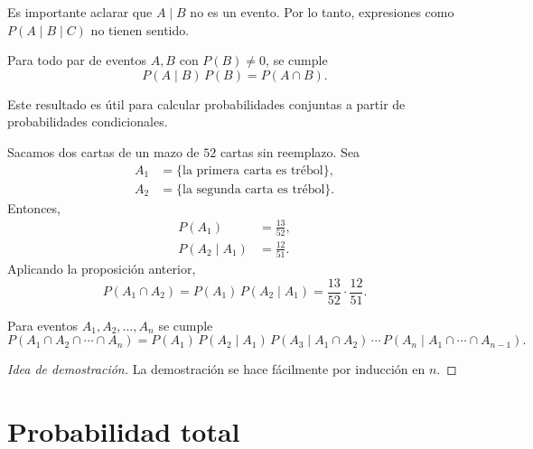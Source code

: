 \begin{remark}
    Es importante aclarar que $A \mid B$ no es un evento. Por lo tanto, expresiones como $P(A \mid B \mid C)$ no tienen sentido.
\end{remark}

\begin{proposition}
    Para todo par de eventos $A, B$ con $P(B) \neq 0$, se cumple
    \begin{equation*}
        P(A \mid B) \, P(B) = P(A \cap B).
    \end{equation*}
\end{proposition}

Este resultado es útil para calcular probabilidades conjuntas a partir de probabilidades condicionales.

\begin{example}
    Sacamos dos cartas de un mazo de $52$ cartas sin reemplazo. Sea
    \begin{align*}
        A_1 &= \{\text{la primera carta es trébol}\}, \\
        A_2 &= \{\text{la segunda carta es trébol}\}.
    \end{align*}
    Entonces,
    \begin{align*}
        P(A_1) &= \frac{13}{52}, \\
        P(A_2 \mid A_1) &= \frac{12}{51}.
    \end{align*}
    Aplicando la proposición anterior,
    \begin{equation*}
        P(A_1 \cap A_2) = P(A_1)\,P(A_2 \mid A_1) = \frac{13}{52} \cdot \frac{12}{51}.
    \end{equation*}
\end{example}

\begin{proposition}
    Para eventos $A_1, A_2, \dots, A_n$ se cumple
    \begin{equation*}
        P(A_1 \cap A_2 \cap \cdots \cap A_n)
        = P(A_1)\,P(A_2 \mid A_1)\,P(A_3 \mid A_1 \cap A_2)\,\cdots\,P(A_n \mid A_1 \cap \cdots \cap A_{n-1}).
    \end{equation*}
\end{proposition}

\begin{proof}[Idea de demostración]
    La demostración se hace fácilmente por inducción en $n$.
\end{proof}

\section{Probabilidad total}

